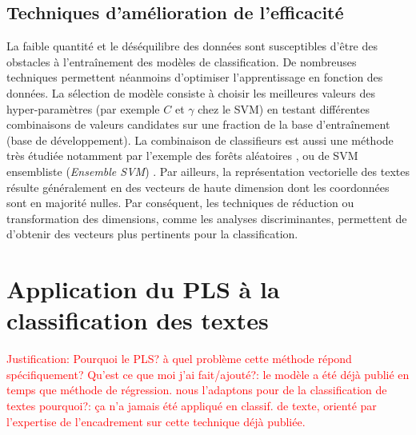 
\subsection{Techniques d'amélioration de l'efficacité}
La faible quantité \citep{ruparel2013smalldataclass} et le déséquilibre des données sont susceptibles d'être des obstacles à l'entraînement des modèles de classification. De nombreuses techniques permettent néanmoins d'optimiser l'apprentissage en fonction des données. La sélection de modèle consiste à choisir les meilleures valeurs des hyper-paramètres (par exemple $C$ et $\gamma$ chez le SVM) en testant différentes combinaisons de valeurs candidates sur une fraction de la base d'entraînement (base de développement). La combinaison de classifieurs est aussi une méthode très étudiée \citep{kittler1996combiningclassifiers,kuncheva2004combiningclassifiers, tulyakov2008combiningclassifiers} notamment par l'exemple des forêts aléatoires \citep{breiman2001randomforest}, ou de SVM ensembliste (\textit{Ensemble SVM}) \citep{dong2005ensembleSVM}.
Par ailleurs, la représentation vectorielle des textes résulte généralement en des vecteurs de haute dimension dont les coordonnées sont en majorité nulles. Par conséquent, les techniques de réduction ou transformation des dimensions, comme les analyses discriminantes, permettent de d'obtenir des vecteurs plus pertinents pour la classification.

\section{Application du PLS à la classification des textes}
\label{sec:sensresultat:pls}
\textcolor{red}{Justification: Pourquoi le PLS? à quel problème cette méthode répond spécifiquement? Qu'est ce que moi j'ai fait/ajouté?: le modèle a été déjà publié en temps que méthode de régression. nous l'adaptons pour de la classification de textes pourquoi?: ça n'a jamais été appliqué en classif. de texte, orienté par l'expertise de l'encadrement sur cette technique déjà publiée.}

